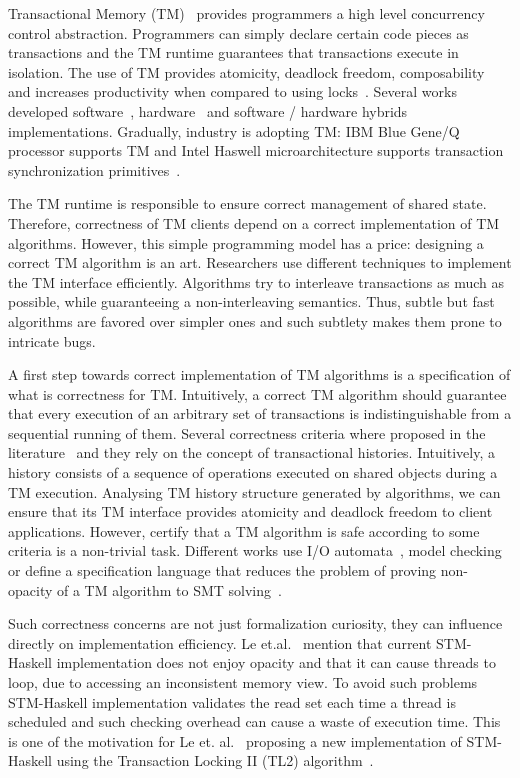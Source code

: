 \documentclass[sigplan, anonymous, review]{acmart}
\theoremstyle{definition}
\begin{document}
Transactional Memory (TM)~\cite{Herlihy1993,Shavit1995} provides programmers a high level concurrency
control abstraction. Programmers can simply declare certain code pieces as
transactions and the TM runtime guarantees that transactions execute in isolation.
The use of TM provides atomicity, deadlock freedom, composability~\cite{Harris05} and
increases productivity when compared to using locks~\cite{Pankratius2011}. Several works developed
software~\cite{Herlihy2003,Herlihy2006,Dice06}, hardware~\cite{Hammond2004} and software / hardware hybrids~\cite{Baugh2008,Dalessandro2011}
implementations. Gradually, industry is adopting TM: IBM Blue Gene/Q processor supports TM and Intel Haswell microarchitecture
supports transaction synchronization primitives~\cite{TSX,Haring2012}.

The TM runtime is responsible to ensure correct management of shared state. Therefore,
correctness of TM clients depend on a correct implementation of TM algorithms. However,
this simple programming model has a price: designing a correct TM algorithm is an art.
Researchers use different techniques to implement the TM interface efficiently. Algorithms
try to interleave transactions as much as possible, while guaranteeing a non-interleaving
semantics. Thus, subtle but fast algorithms are favored over simpler ones and such subtlety
makes them prone to intricate bugs.


A first step towards correct implementation of TM algorithms is a specification of what
is correctness for TM. Intuitively, a correct TM algorithm should guarantee that every
execution of an arbitrary set of transactions is indistinguishable from a sequential
running of them. Several correctness criteria where proposed in the
literature~\cite{Guerraoui2008,Doherty2009,Imbs2009,LesaniP14} and
they rely on the concept of transactional histories. Intuitively,
a history consists of a sequence of operations executed on shared objects
during a TM execution. Analysing TM history structure generated by algorithms,
we can ensure that its TM interface provides atomicity and deadlock freedom to client
applications. However, certify that a TM algorithm is safe according to some criteria
is a non-trivial task. Different works use I/O automata~\cite{Lesani2012}, model
checking~\cite{CohenPZ08,cohen2007,Guerraoui2008a} or define a specification language that
reduces the problem of proving non-opacity of a TM algorithm to SMT solving~\cite{Lesani2013,DeMoura2008}.

Such correctness concerns are not just formalization curiosity, they can influence directly on implementation efficiency.
Le et.al.~\cite{Le2016} mention that current STM-Haskell implementation does not enjoy opacity and that it
can cause threads to loop, due to accessing an inconsistent memory view. To avoid such problems STM-Haskell
implementation validates the read set each time a thread is scheduled and such checking overhead can cause
a waste of execution time. This is one of the motivation for Le et. al.~\cite{Le2016} proposing a new
implementation of STM-Haskell using the Transaction Locking II (TL2) algorithm~\cite{Dice06}. 
\end{document}
